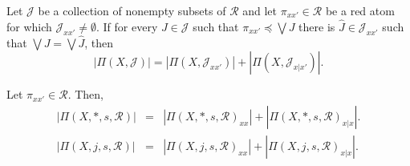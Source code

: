 \documentclass[10pt,a4paper]{amsart}
\begin{document}
	\begin{Proposition}\label{RecursiveFormulaAtoms} 	
		Let	$\mathcal{J}$ be a collection of nonempty subsets of $\mathcal{R}$ and let $\pi_{xx'}\in \mathcal{R}$ be a red atom for which $\mathcal{J}_{xx'}\neq\emptyset$. If for every $J\in\mathcal{J}$ such that $\pi_{xx'}\preceq\bigvee J$ there is $\hat{J}\in\mathcal{J}_{xx'}$ such that $\bigvee J=\bigvee\hat{J}$, then
		\begin{equation}
		|\Pi(X,\mathcal{J})| = 	|\Pi(X,\mathcal{J}_{xx'})|+ 	|\Pi(X,\mathcal{J}_{x|x'})|.
		\end{equation}	
	\end{Proposition}

	\begin{Corollary}\label{CorollaryProposition4.4} Let $\pi_{xx'}\in \mathcal{R}$. Then,
		\begin{eqnarray}
		|\Pi(X, \ast, s, \mathcal{R})| &= &|\Pi(X, \ast, s, \mathcal{R})_{xx}|+|\Pi(X,\ast, s, \mathcal{R})_{x|x}|.\\
		|\Pi(X, j, s,\mathcal{R})|& = & |\Pi(X, j, s,\mathcal{R})_{xx}|+|\Pi(X, j, s,\mathcal{R})_{x|x}|.\\
		\nonumber
		\end{eqnarray}
	\end{Corollary}
\end{document}
